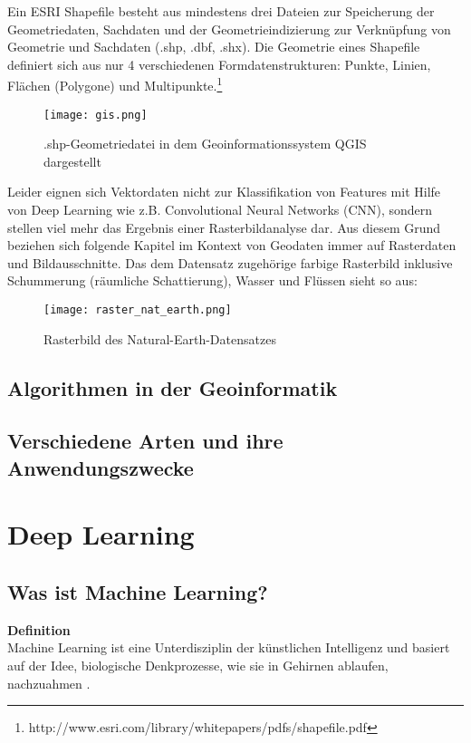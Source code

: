\documentclass[11pt,fleqn]{book}
\begin{document}
Ein ESRI Shapefile besteht aus mindestens drei Dateien zur Speicherung der Geometriedaten, Sachdaten und der Geometrieindizierung zur Verknüpfung von Geometrie und Sachdaten (.shp, .dbf, .shx). Die Geometrie eines Shapefile definiert sich aus nur 4 verschiedenen Formdatenstrukturen: Punkte, Linien, Flächen (Polygone) und Multipunkte.\footnote{http://www.esri.com/library/whitepapers/pdfs/shapefile.pdf}

\begin{figure}[h]
\centering
\texttt{[image: gis.png]}
\caption{.shp-Geometriedatei in dem Geoinformationssystem QGIS dargestellt \protect\footnotemark}
\end{figure}
Leider eignen sich Vektordaten nicht zur Klassifikation von Features mit Hilfe von Deep Learning wie z.B. Convolutional Neural Networks (CNN), sondern stellen viel mehr das Ergebnis einer Rasterbildanalyse dar. Aus diesem Grund beziehen sich folgende Kapitel im Kontext von Geodaten immer auf Rasterdaten und Bildausschnitte.
\newline
Das dem Datensatz zugehörige farbige Rasterbild inklusive Schummerung (räumliche Schattierung), Wasser und Flüssen sieht so aus:

\begin{figure}[h]
\centering
\texttt{[image: raster\_nat\_earth.png]}
\caption{Rasterbild des Natural-Earth-Datensatzes \protect\footnotemark}
\end{figure}

\section{Algorithmen in der Geoinformatik}
\section{Verschiedene Arten und ihre Anwendungszwecke}


\chapter{Deep Learning}

\section{Was ist Machine Learning?}
\textbf{Definition}\\
Machine Learning ist eine Unterdisziplin der künstlichen Intelligenz und basiert auf der Idee, biologische Denkprozesse, wie sie in Gehirnen ablaufen, nachzuahmen \cite{geofront}.
\end{document}
